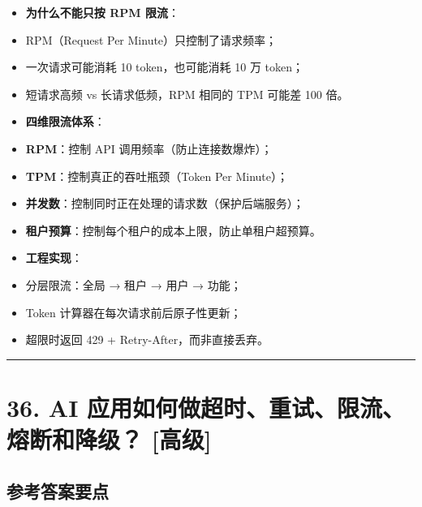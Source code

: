 \documentclass[9pt,a4paper,twocolumn]{ctexart}
\newcommand{\lvgao}{\usebox{\badgegaobox}}
\def\lvgao{[高级]}%
\begin{document}
\begin{itemize}[itemsep=1pt, topsep=2pt]
  \item \textbf{为什么不能只按 RPM 限流}：
  \item RPM（Request Per Minute）只控制了请求频率；
  \item 一次请求可能消耗 10 token，也可能消耗 10 万 token；
  \item 短请求高频 vs 长请求低频，RPM 相同的 TPM 可能差 100 倍。
  \item \textbf{四维限流体系}：
  \item \textbf{RPM}：控制 API 调用频率（防止连接数爆炸）；
  \item \textbf{TPM}：控制真正的吞吐瓶颈（Token Per Minute）；
  \item \textbf{并发数}：控制同时正在处理的请求数（保护后端服务）；
  \item \textbf{租户预算}：控制每个租户的成本上限，防止单租户超预算。
  \item \textbf{工程实现}：
  \item 分层限流：全局 → 租户 → 用户 → 功能；
  \item Token 计算器在每次请求前后原子性更新；
  \item 超限时返回 429 + Retry-After，而非直接丢弃。
\end{itemize}


\vspace{2pt}
\noindent\rule{\columnwidth}{0.3pt}\vspace{2pt}



\section*{36. AI 应用如何做超时、重试、限流、熔断和降级？ \lvgao{}}


\subsection*{参考答案要点}
\end{document}
